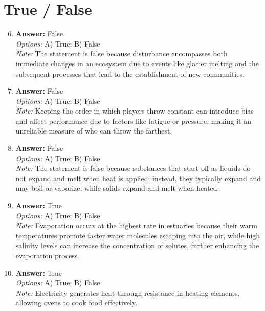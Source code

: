 \documentclass[12pt]{article}
\begin{document}
\section*{True / False}
\begin{enumerate}[label=\arabic*.]
\setcounter{enumi}{5}
\item \textbf{Answer:} False
\\ \textit{Options:} A) True; B) False
\\ \textit{Note:} The statement is false because disturbance encompasses both immediate changes in an ecosystem due to events like glacier melting and the subsequent processes that lead to the establishment of new communities.
\item \textbf{Answer:} False
\\ \textit{Options:} A) True; B) False
\\ \textit{Note:} Keeping the order in which players throw constant can introduce bias and affect performance due to factors like fatigue or pressure, making it an unreliable measure of who can throw the farthest.
\item \textbf{Answer:} False
\\ \textit{Options:} A) True; B) False
\\ \textit{Note:} The statement is false because substances that start off as liquids do not expand and melt when heat is applied; instead, they typically expand and may boil or vaporize, while solids expand and melt when heated.
\item \textbf{Answer:} True
\\ \textit{Options:} A) True; B) False
\\ \textit{Note:} Evaporation occurs at the highest rate in estuaries because their warm temperatures promote faster water molecules escaping into the air, while high salinity levels can increase the concentration of solutes, further enhancing the evaporation process.
\item \textbf{Answer:} True
\\ \textit{Options:} A) True; B) False
\\ \textit{Note:} Electricity generates heat through resistance in heating elements, allowing ovens to cook food effectively.
\end{enumerate}
\end{document}

